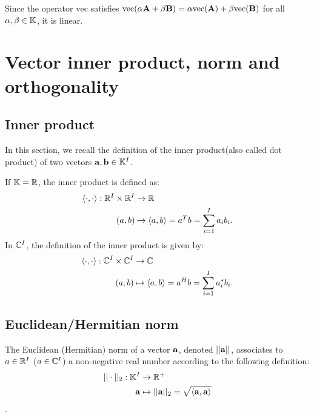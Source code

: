 \begin{remark}
    Since the operator $\text{vec}$ satisfies $\text{vec}(\alpha \bold{A}+\beta \bold{B})=\alpha \text{vec}(\bold{A})+\beta \text{vec}(\bold{B})$
    for all $\alpha,\beta\in\mathbb{K}$, it is linear.
\end{remark}


\section{Vector inner product, norm and orthogonality}
\subsection{Inner product}

In this section, we recall the definition of the inner product(also called dot product)
of two vectors $\bold{a},\bold{b}\in\mathbb{K}^{I}$.
\begin{definition}{}{}
    If $\mathbb{K}=\mathbb{R}$, the inner product is defined as:
    \begin{align*}
        \langle\cdot,\cdot\rangle:\mathbb{R}^I\times \mathbb{R}^I&\rightarrow \mathbb{R}\\
        (a,b)&\mapsto \langle a,b\rangle = a^Tb=\sum\limits_{i=1}^{I}a_ib_i.
    \end{align*}
    In $\mathbb{C}^I$, the definition of the inner product is given by:
    \begin{align*}
        \langle\cdot,\cdot\rangle:\mathbb{C}^I\times \mathbb{C}^I&\rightarrow \mathbb{C}\\
        (a,b)&\mapsto \langle a,b\rangle = a^Hb=\sum\limits_{i=1}^{I}a_i^*b_i.
    \end{align*}
\end{definition}


\subsection{Euclidean/Hermitian norm}
\begin{definition}{}{}
    The Euclidean (Hermitian) norm of a vector $\bold{a}$, denoted $||\bold{a}||$, 
    associates to $a\in\mathbb{R}^I$ ($a\in\mathbb{C}^I$) a non-negative real number according to the following definition:
    \begin{align*}
        ||\cdot||_2 : \mathbb{K}^I &\rightarrow \mathbb{R}^+\\
        \bold{a} &\mapsto ||\bold{a}||_2=\sqrt{\langle\bold{a},\bold{a}\rangle}
    \end{align*}.
\end{definition}


